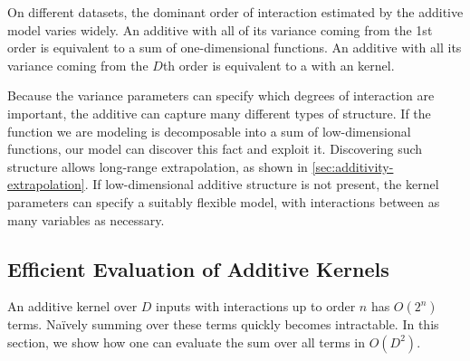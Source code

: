 On different datasets, the dominant order of interaction estimated by the additive model varies widely.
An additive \gp{} with all of its variance coming from the 1st order is equivalent to a sum of one-dimensional functions.
An additive \gp{} with all its variance coming from the $D$th order is equivalent to a \gp{} with an \seard{} kernel.
%
%


Because the variance parameters can specify which degrees of interaction are important, the additive \gp{} can capture many different types of structure.
If the function we are modeling is decomposable into a sum of low-dimensional functions, our model can discover this fact and exploit it.
Discovering such structure allows long-range extrapolation, as shown in \cref{sec:additivity-extrapolation}.
If low-dimensional additive structure is not present, the kernel parameters can specify a suitably flexible model, with interactions between as many variables as necessary.





\subsection{Efficient Evaluation of Additive Kernels}
An additive kernel over $D$ inputs with interactions up to order $n$ has $O(2^n)$ terms.
Na\"{i}vely summing over these terms quickly becomes intractable.
In this section, we show how one can evaluate the sum over all terms in $O(D^2)$.

